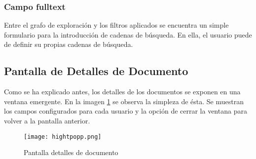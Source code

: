 \subsubsection{Campo \gls{fulltext}}
Entre el grafo de exploración y los filtros aplicados  se encuentra un simple formulario para la introducción de cadenas de búsqueda. En ella, el usuario puede de definir su propias cadenas de búsqueda.

\subsection{Pantalla de Detalles de Documento}
\label{subsection:detalles}
Como se ha explicado antes, los detalles de los documentos se exponen en una ventana emergente. En la imagen \ref{image:uidetalles} se observa la simpleza de ésta. Se muestran los campos configurados para cada usuario y la opción de cerrar la ventana para volver a la pantalla anterior.

\begin{figure}[h!]
  \centering
  	\texttt{[image: hightpopp.png]}
  \caption{Pantalla detalles de documento}
  \label{image:uidetalles}
\end{figure}


